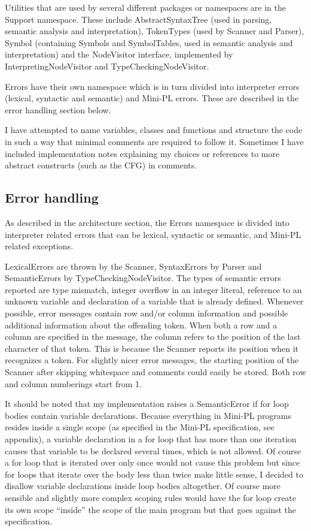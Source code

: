 \documentclass[a4paper,11pt]{article}
\begin{document}
Utilities that are used by several different packages or namespaces are in the Support namespace. These include AbstractSyntaxTree (used in parsing, semantic analysis and interpretation), TokenTypes (used by Scanner and Parser), Symbol (containing Symbols and SymbolTables, used in semantic analysis and interpretation) and the NodeVisitor interface, implemented by InterpretingNodeVisitor and TypeCheckingNodeVisitor.

Errors have their own namespace which is in turn divided into interpreter errors (lexical, syntactic and semantic) and Mini-PL errors. These are described in the error handling section below.

I have attempted to name variables, classes and functions and structure the code in such a way that minimal comments are required to follow it. Sometimes I have included implementation notes explaining my choices or references to more abstract constructs (such as the CFG) in comments.

\subsection{Error handling}

As described in the architecture section, the Errors namespace is divided into interpreter related errors that can be lexical, syntactic or semantic, and Mini-PL related exceptions.

LexicalErrors are thrown by the Scanner, SyntaxErrors by Parser and SemanticErrors by TypeCheckingNodeVisitor. The types of semantic errors reported are type mismatch, integer overflow in an integer literal, reference to an unknown variable and declaration of a variable that is already defined. Whenever possible, error messages contain row and/or column information and possible additional information about the offending token. When both a row and a column are specified in the message, the column refers to the position of the last character of that token. This is because the Scanner reports its position when it recognizes a token. For slightly nicer error messages, the starting position of the Scanner after skipping whitespace and comments could easily be stored. Both row and column numberings start from 1.

It should be noted that my implementation raises a SemanticError if for loop bodies contain variable declarations. Because everything in Mini-PL programs resides inside a single scope (as specified in the Mini-PL specification, see appendix), a variable declaration in a for loop that has more than one iteration causes that variable to be declared several times, which is not allowed. Of course a for loop that is iterated over only once would not cause this problem but since for loops that iterate over the body less than twice make little sense, I decided to disallow variable declarations inside loop bodies altogether. Of course more sensible and slightly more complex scoping rules would have the for loop create its own scope ``inside'' the scope of the main program but that goes against the specification.
\end{document}
